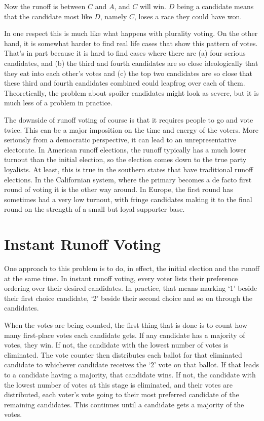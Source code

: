 \documentclass[11pt,]{article}
\begin{document}
Now the runoff is between \(C\) and \(A\), and \(C\) will win. \(D\)
being a candidate means that the candidate most like \(D\), namely
\(C\), loses a race they could have won.

In one respect this is much like what happens with plurality voting. On
the other hand, it is somewhat harder to find real life cases that show
this pattern of votes. That's in part because it is hard to find cases
where there are (a) four serious candidates, and (b) the third and
fourth candidates are so close ideologically that they eat into each
other's votes and (c) the top two candidates are so close that these
third and fourth candidates combined could leapfrog over each of them.
Theoretically, the problem about spoiler candidates might look as
severe, but it is much less of a problem in practice.

The downside of runoff voting of course is that it requires people to go
and vote twice. This can be a major imposition on the time and energy of
the voters. More seriously from a democratic perspective, it can lead to
an unrepresentative electorate. In American runoff elections, the runoff
typically has a much lower turnout than the initial election, so the
election comes down to the true party loyalists. At least, this is true
in the southern states that have traditional runoff elections. In the
Californian system, where the primary becomes a de facto first round of
voting it is the other way around. In Europe, the first round has
sometimes had a very low turnout, with fringe candidates making it to
the final round on the strength of a small but loyal supporter base.

\hypertarget{instant-runoff-voting}{%
\section{Instant Runoff Voting}\label{instant-runoff-voting}}

One approach to this problem is to do, in effect, the initial election
and the runoff at the same time. In instant runoff voting, every voter
lists their preference ordering over their desired candidates. In
practice, that means marking `1' beside their first choice candidate,
`2' beside their second choice and so on through the candidates.

When the votes are being counted, the first thing that is done is to
count how many first-place votes each candidate gets. If any candidate
has a majority of votes, they win. If not, the candidate with the lowest
number of votes is eliminated. The vote counter then distributes each
ballot for that eliminated candidate to whichever candidate receives the
`2' vote on that ballot. If that leads to a candidate having a majority,
that candidate wins. If not, the candidate with the lowest number of
votes at this stage is eliminated, and their votes are distributed, each
voter's vote going to their most preferred candidate of the remaining
candidates. This continues until a candidate gets a majority of the
votes.
\end{document}
